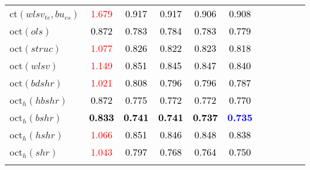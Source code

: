 \begin{tabular}[t]{l|>{}cccc>{}c|ccccc}
ct$(wlsv_{te}, bu_{cs})$ & \textcolor{red}{1.679} & \textcolor{black}{0.917} & \textcolor{black}{0.917} & \textcolor{black}{0.906} & \textcolor{black}{0.908} &  &  &  &  & \\
oct$(ols)$ & \textcolor{black}{0.872} & \textcolor{black}{0.783} & \textcolor{black}{0.784} & \textcolor{black}{0.783} & \textcolor{black}{0.779} &  &  &  &  & \\
oct$(struc)$ & \textcolor{red}{1.077} & \textcolor{black}{0.826} & \textcolor{black}{0.822} & \textcolor{black}{0.823} & \textcolor{black}{0.818} &  &  &  &  & \\
oct$(wlsv)$ & \textcolor{red}{1.149} & \textcolor{black}{0.851} & \textcolor{black}{0.845} & \textcolor{black}{0.847} & \textcolor{black}{0.840} &  &  &  &  & \\
oct$(bdshr)$ & \textcolor{red}{1.021} & \textcolor{black}{0.808} & \textcolor{black}{0.796} & \textcolor{black}{0.796} & \textcolor{black}{0.787} &  &  &  &  & \\
oct$_h(hbshr)$ & \textcolor{black}{0.872} & \textcolor{black}{0.775} & \textcolor{black}{0.772} & \textcolor{black}{0.772} & \textcolor{black}{0.770} &  &  &  &  & \\
oct$_h(bshr)$ & \textcolor{black}{\textbf{0.833}} & \textcolor{black}{\textbf{0.741}} & \textcolor{black}{\textbf{0.741}} & \textcolor{black}{\textbf{0.737}} & \textcolor{blue}{\textbf{0.735}} &  &  &  &  & \\
oct$_h(hshr)$ & \textcolor{red}{1.066} & \textcolor{black}{0.851} & \textcolor{black}{0.846} & \textcolor{black}{0.848} & \textcolor{black}{0.838} &  &  &  &  & \\
oct$_h(shr)$ & \textcolor{red}{1.043} & \textcolor{black}{0.797} & \textcolor{black}{0.768} & \textcolor{black}{0.764} & \textcolor{black}{0.750} &  &  &  &  & \\
\bottomrule
{}\\
\end{tabular}
